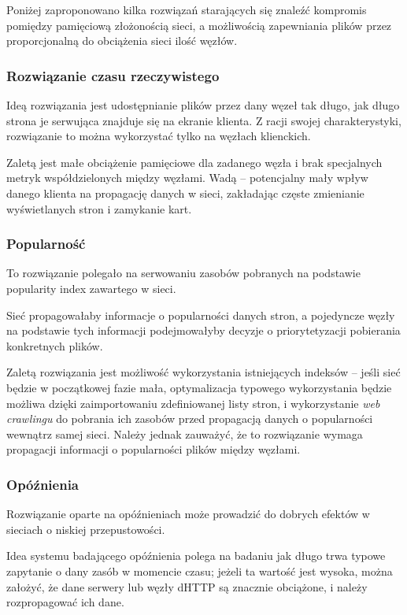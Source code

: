 Poniżej zaproponowano kilka rozwiązań starających się znaleźć kompromis pomiędzy pamięciową złożonością sieci, a możliwością zapewniania plików przez proporcjonalną do obciążenia sieci ilość węzłów.

\subsubsection{Rozwiązanie czasu rzeczywistego}
Ideą rozwiązania jest udostępnianie plików przez dany węzeł tak długo, jak długo strona je serwująca znajduje się na ekranie klienta. Z racji swojej charakterystyki, rozwiązanie to można wykorzystać tylko na węzłach klienckich.

Zaletą jest małe obciążenie pamięciowe dla zadanego węzła i brak specjalnych metryk współdzielonych między węzłami.
Wadą -- potencjalny mały wpływ danego klienta na propagację danych w sieci, zakładając częste zmienianie wyświetlanych stron i zamykanie kart.

\subsubsection{Popularność}
To rozwiązanie polegało na serwowaniu zasobów pobranych na podstawie popularity index zawartego w sieci.

Sieć propagowałaby informacje o popularności danych stron, a pojedyncze węzły na podstawie tych informacji podejmowałyby decyzje o priorytetyzacji pobierania konkretnych plików.

Zaletą rozwiązania jest możliwość wykorzystania istniejących indeksów -- jeśli sieć będzie w początkowej fazie mała, optymalizacja typowego wykorzystania będzie możliwa dzięki zaimportowaniu zdefiniowanej listy stron, i wykorzystanie {\em web crawlingu} do pobrania ich zasobów przed propagacją danych o popularności wewnątrz samej sieci. Należy jednak zauważyć, że to rozwiązanie wymaga propagacji informacji o popularności plików między węzłami.

\subsubsection{Opóźnienia}
Rozwiązanie oparte na opóźnieniach może prowadzić do dobrych efektów w sieciach o niskiej przepustowości.

Idea systemu badającego opóźnienia polega na badaniu jak długo trwa typowe zapytanie o dany zasób w momencie czasu; jeżeli ta wartość jest wysoka, można założyć, że dane serwery lub węzły dHTTP są znacznie obciążone, i należy rozpropagować ich dane.

